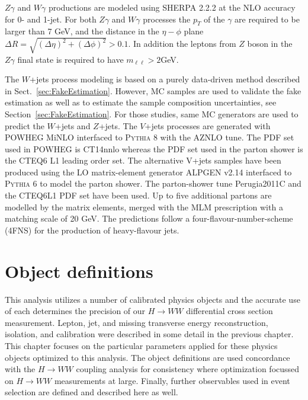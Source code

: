 $Z\gamma$ and $W\gamma$ productions are modeled using \textsc{SHERPA} 2.2.2 at the NLO accuracy for 0- and 1-jet.
For both $Z\gamma$ and $W\gamma$ processes the $p_T$ of the $\gamma$ are
required to be larger than 7 GeV, and the distance in the $\eta - \phi$ plane
$\Delta R = \sqrt{(\Delta \eta)^{2} + (\Delta \phi)^{2}} > 0.1$.
In addition the leptons from $Z$ boson in the $Z\gamma$ final state is required to have $m_{\ell\ell} > 2 $GeV.

The $W$+jets process modeling is based on a purely data-driven method described in Sect.~\ref{sec:FakeEstimation}.
However, MC samples are used to validate the fake estimation as well as to estimate the sample composition uncertainties, see Section~\ref{sec:FakeEstimation}. For those studies, same MC generators are used to predict the $W$+jets and $Z$+jets.
The $V$+jets processes are generated with \textsc{POWHEG} MiNLO interfaced to \textsc{Pythia 8} with the AZNLO tune. 
The PDF set used in \textsc{POWHEG} is CT14nnlo whereas the PDF set used in the parton shower is the CTEQ6 L1 leading order set.
The alternative V+jets samples have been produced using the LO matrix-element generator ALPGEN v2.14 interfaced to \textsc{Pythia 6} to model the parton shower. The parton-shower tune Perugia2011C and the CTEQ6L1 PDF set have been used. 
Up to five additional partons are modelled by the matrix elements, merged with the MLM prescription with a matching scale of 20 GeV. 
The predictions follow a four-flavour-number-scheme (4FNS) for the production of heavy-flavour jets.

\section{Object definitions}
This analysis utilizes a number of calibrated physics objects and the accurate use of each determines the precision of our $H\rightarrow WW$ differential cross section measurement. Lepton, jet, and missing transverse energy reconstruction, isolation, and calibration were described in some detail in the previous chapter. This chapter focuses on the particular parameters applied for these physics objects optimized to this analysis. The object definitions are used concordance with the $H\rightarrow WW$ coupling analysis for consistency where optimization focussed on $H \rightarrow WW$ measurements at large. Finally, further observables used in event selection are defined and described here as well. 

